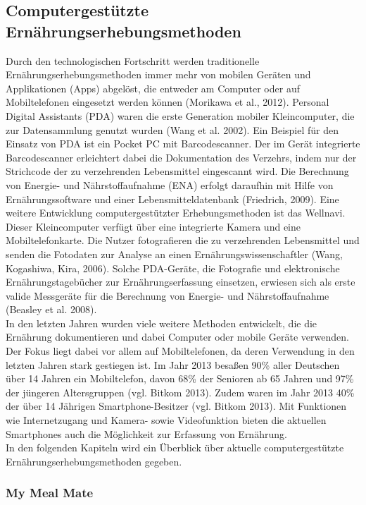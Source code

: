 \subsection{Computergestützte Ernährungserhebungsmethoden}

Durch den technologischen Fortschritt werden traditionelle Ernährungserhebungsmethoden immer mehr von mobilen Geräten und Applikationen (Apps) abgelöst, die entweder am Computer oder auf Mobiltelefonen eingesetzt werden können (Morikawa et al., 2012). Personal Digital Assistants (PDA) waren die erste Generation mobiler Kleincomputer, die zur Datensammlung genutzt wurden (Wang et al. 2002). Ein Beispiel für den Einsatz von PDA ist ein Pocket PC mit Barcodescanner. Der im Gerät integrierte Barcodescanner erleichtert dabei die Dokumentation des Verzehrs, indem nur der Strichcode der zu verzehrenden Lebensmittel eingescannt wird. Die Berechnung von Energie- und Nährstoffaufnahme (ENA) erfolgt daraufhin mit Hilfe von Ernährungssoftware und einer Lebensmitteldatenbank (Friedrich, 2009). Eine weitere Entwicklung computergestützter Erhebungsmethoden ist das Wellnavi. Dieser Kleincomputer verfügt über eine integrierte Kamera und eine Mobiltelefonkarte. Die Nutzer fotografieren die zu verzehrenden Lebensmittel und senden die Fotodaten zur Analyse an einen Ernährungswissenschaftler (Wang, Kogashiwa, Kira, 2006). Solche PDA-Geräte, die Fotografie und elektronische Ernährungstagebücher zur Ernährungserfassung einsetzen,  erwiesen sich als erste valide Messgeräte  für die Berechnung von Energie- und Nährstoffaufnahme (Beasley et al. 2008). \\
In den letzten Jahren wurden viele weitere Methoden entwickelt, die die Ernährung dokumentieren und dabei Computer oder mobile Geräte verwenden. Der Fokus liegt dabei vor allem auf Mobiltelefonen, da deren Verwendung in den letzten Jahren stark gestiegen ist. Im Jahr 2013 besaßen 90\% aller Deutschen über 14 Jahren ein Mobiltelefon, davon 68\% der Senioren ab 65 Jahren und 97\% der jüngeren Altersgruppen (vgl. Bitkom 2013). Zudem waren im Jahr 2013 40\% der über 14 Jährigen Smartphone-Besitzer (vgl. Bitkom 2013). Mit Funktionen wie Internetzugang und Kamera- sowie Videofunktion bieten die aktuellen Smartphones auch die Möglichkeit zur Erfassung von Ernährung.\\
In den folgenden Kapiteln wird ein Überblick über  aktuelle computergestützte Ernährungserhebungsmethoden gegeben. 



\subsubsection{My Meal Mate}


